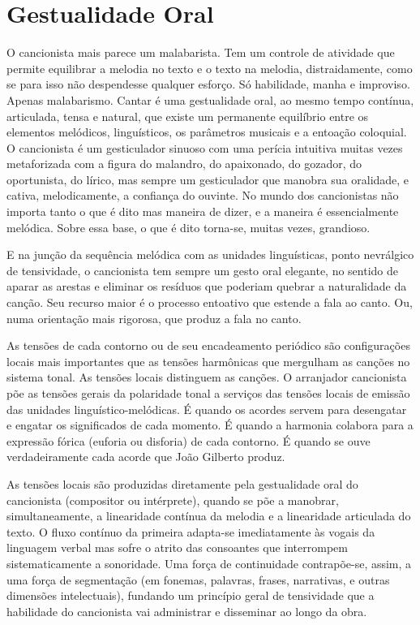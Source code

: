 \section{Gestualidade Oral}

O cancionista mais parece um malabarista. Tem um controle de atividade
que permite equilibrar a melodia no texto e o texto na melodia,
distraidamente, como se para isso não despendesse qualquer esforço. Só
habilidade, manha e improviso. Apenas malabarismo. Cantar é uma
gestualidade oral, ao mesmo tempo contínua, articulada, tensa e natural,
que existe um permanente equilíbrio entre os elementos melódicos,
linguísticos, os parâmetros musicais e a entoação coloquial. O
cancionista é um gesticulador sinuoso com uma perícia intuitiva muitas
vezes metaforizada com a figura do malandro, do apaixonado, do gozador,
do oportunista, do lírico, mas sempre um gesticulador que manobra sua
oralidade, e cativa, melodicamente, a confiança do ouvinte. No mundo dos
cancionistas não importa tanto o que é dito mas maneira de dizer, e a
maneira é essencialmente melódica. Sobre essa base, o que é dito
torna-se, muitas vezes, grandioso.~

E na junção da sequência melódica com as unidades linguísticas, ponto
nevrálgico de tensividade, o cancionista tem sempre um gesto oral
elegante, no sentido de aparar as arestas e eliminar os resíduos que
poderiam quebrar a naturalidade da canção. Seu recurso maior é o
processo entoativo que estende a fala ao canto. Ou, numa orientação mais
rigorosa, que produz a fala no canto.

As tensões de cada contorno ou de seu encadeamento periódico são
configurações locais mais importantes que as tensões harmônicas que
mergulham as canções no sistema tonal. As tensões locais distinguem as
canções. O arranjador cancionista põe as tensões gerais da polaridade
tonal a serviços das tensões locais de emissão das unidades
linguístico-melódicas. É quando os acordes servem para desengatar e
engatar os significados de cada momento. É quando a harmonia colabora
para a expressão fórica (euforia ou disforia) de cada contorno. É quando
se ouve verdadeiramente cada acorde que João Gilberto produz.

As tensões locais são produzidas diretamente pela gestualidade oral do
cancionista (compositor ou intérprete), quando se põe a manobrar,
simultaneamente, a linearidade contínua da melodia e a linearidade
articulada do texto. O fluxo contínuo da primeira adapta-se
imediatamente às vogais da linguagem verbal mas sofre o atrito das
consoantes que interrompem sistematicamente a sonoridade. Uma força de
continuidade contrapõe-se, assim, a uma força de segmentação (em
fonemas, palavras, frases, narrativas, e outras dimensões intelectuais),
fundando um princípio geral de tensividade que a habilidade do
cancionista vai administrar e disseminar ao longo da obra.

